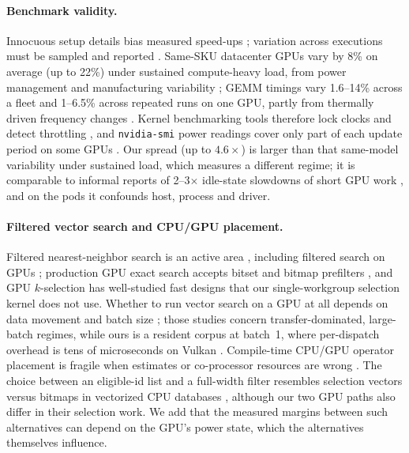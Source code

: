 \paragraph{Benchmark validity.} Innocuous setup details bias measured speed-ups \citep{mytkowicz2009wrongdata}; variation across executions must be sampled and reported \citep{kalibera2013rigorous,maricq2018taming,hoefler2015scientific}. Same-SKU datacenter GPUs vary by 8\% on average (up to 22\%) under sustained compute-heavy load, from power management and manufacturing variability \citep{sinha2022notallgpus}; GEMM timings vary 1.6--14\% across a fleet and 1--6.5\% across repeated runs on one GPU, partly from thermally driven frequency changes \citep{golden2025prism}. Kernel benchmarking tools therefore lock clocks and detect throttling \citep{nvidia_ncu,nvidia_nvbench,oliaro2026fastkernels}, and \texttt{nvidia-smi} power readings cover only part of each update period on some GPUs \citep{yang2023parttime}. Our spread (up to $4.6\times$) is larger than that same-model variability under sustained load, which measures a different regime; it is comparable to informal reports of 2--3$\times$ idle-state slowdowns of short GPU work \citep{nvidia_forum_idle}, and on the pods it confounds host, process and driver.

\paragraph{Filtered vector search and CPU/GPU placement.} Filtered nearest-neighbor search is an active area \citep{gollapudi2023filtered,patel2024acorn,iff2026fanns,shi2025unified,li2025attribute,amanbayev2026systems}, including filtered search on GPUs \citep{xi2025vecflow}; production GPU exact search accepts bitset and bitmap prefilters \citep{nvidia_cuvs_bf}, and GPU $k$-selection has well-studied fast designs \citep{johnson2019billion,zhang2023airtopk} that our single-workgroup selection kernel does not use. Whether to run vector search on a GPU at all depends on data movement and batch size \citep{gregg2011whereisdata,mageirakos2026togpu}; those studies concern transfer-dominated, large-batch regimes, while ours is a resident corpus at batch~1, where per-dispatch overhead is tens of microseconds on Vulkan \citep{maczan2026webgpu}. Compile-time CPU/GPU operator placement is fragile when estimates or co-processor resources are wrong \citep{bress2016robust,karnagel2017adaptive,rosenfeld2022survey}. The choice between an eligible-id list and a full-width filter resembles selection vectors versus bitmaps in vectorized CPU databases \citep{ngom2021filter}, although our two GPU paths also differ in their selection work. We add that the measured margins between such alternatives can depend on the GPU's power state, which the alternatives themselves influence.
